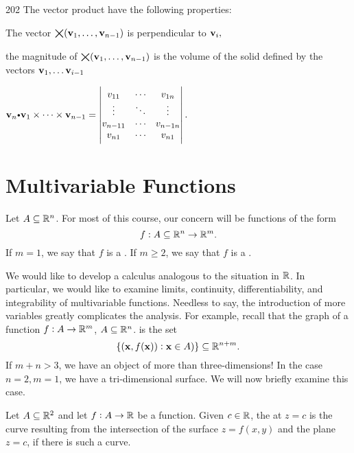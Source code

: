 \begin{prop} 
\begin{dingautolist}{202} The vector product have the following properties:
\item The vector $\bigtimes(\mathbf{ v}_1,\dots,\mathbf{ v}_{n-1})$ is 
  perpendicular to  \( \mathbf{ v}_{i},\)
\item
 the  magnitude of $\bigtimes(\mathbf{ v}_1,\dots,\mathbf{ v}_{n-1})$ is the volume of the solid  defined by the vectors
\( \mathbf{ v}_{1}, \dots \mathbf{ v}_{i-1}\)
\item 
$\vector{v}_n\bp  \vector{v}_{1} \times \cdots \times \vector{v}_{n-1} =
  \begin{vmatrix}
    v_{11} &\cdots &v_{1n}\\
    \vdots  &\ddots &\vdots\\
    v_{n-1 1} & \cdots &v_{n-1 n}\\
    v_{n1} &\cdots &v_{n1}
  \end{vmatrix}.$
\end{dingautolist}  
\end{prop}



\section{Multivariable Functions}
Let $A\subseteq \mathbb{R}^n$. For most of this course, our concern will
be functions of the form
$$f:A \subseteq \mathbb{R}^n \to \mathbb{R}^m.  $$If $m=1$, we say that $f$ is a 
. If $m\geq 2$, we say that $f$ is a .




We would like to develop a calculus analogous to the situation in
$\mathbb{R}$. In particular, we would like to examine limits,
continuity, differentiability, and integrability of multivariable
functions. Needless to say, the introduction of more variables
greatly complicates the analysis. For example, recall that the graph
of a function $f:A\rightarrow \mathbb{R}^m$, $A\subseteq \mathbb{R}^n$.  is
the set
$$ \{({\mathbf x},f({\mathbf x})): {\mathbf x}\in A)\}\subseteq \mathbb{R}^{n+m}. $$
If $m+n>3$, we have an object of more than three-dimensions! In the case $n=2, m=1$, we have a tri-dimensional surface.
We will now briefly examine this case.

\begin{df}
Let $A\subseteq \mathbb{R}^2$ and let $f:A\to \mathbb{R}$ be a function.
Given $c\in\mathbb{R}$, the  at $z=c$ is the curve
resulting from the intersection of the surface $z=f(x,y)$ and the
plane $z=c$, if there is such a curve.
\end{df}



